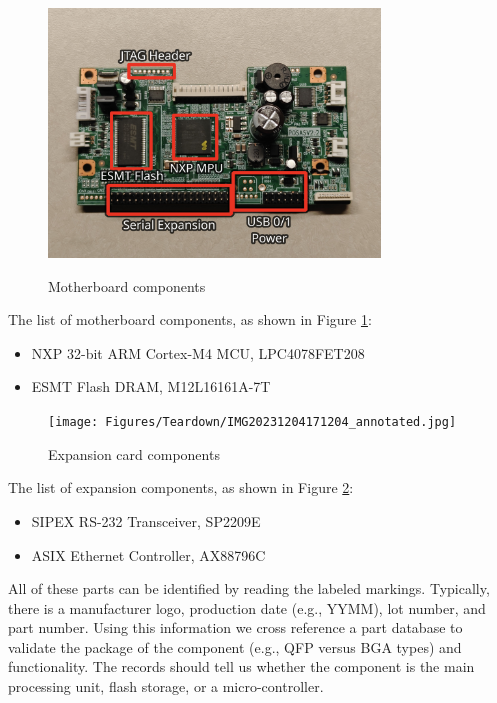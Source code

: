 \begin{figure}[ht]
    \centering
    {\includegraphics[width=88mm,scale=0.5]
    {Figures/Teardown/IMG20231204171516_annotated.jpg}}
    \caption{Motherboard components}
    \label{fig:snbc_btp_s80_motherboard}
\end{figure}

The list of motherboard components, as shown in Figure \ref{fig:snbc_btp_s80_motherboard}:
\begin{itemize}
    \item NXP 32-bit ARM Cortex-M4 MCU, LPC4078FET208
    \item ESMT Flash DRAM, M12L16161A-7T
\end{itemize}

\begin{figure}[ht]
    \centering
    {\texttt{[image: Figures/Teardown/IMG20231204171204\_annotated.jpg]}}
    \caption{Expansion card components}
    \label{fig:snbc_btp_s80_expansion_components}
\end{figure}

The list of expansion components, as shown in Figure \ref{fig:snbc_btp_s80_expansion_components}:
\begin{itemize}
    \item SIPEX RS-232 Transceiver, SP2209E
    \item ASIX Ethernet Controller, AX88796C
\end{itemize}

All of these parts can be identified by reading the labeled markings. Typically, there is a manufacturer logo, production date (e.g., YYMM), lot number, and part number. Using this information we cross reference a part database to validate the package of the component (e.g., QFP versus BGA types) and functionality. The records should tell us whether the component is the main processing unit, flash storage, or a micro-controller.  

